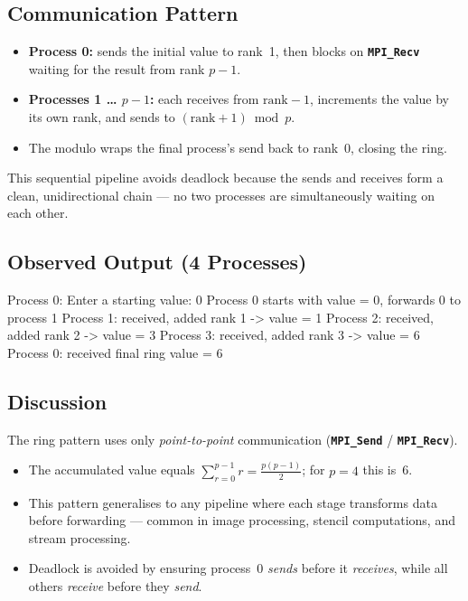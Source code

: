 \documentclass[12pt,a4paper]{article}
\newcommand{\mpiname}[1]{\texttt{\textbf{#1}}}
\begin{document}
\subsection{Communication Pattern}

\begin{itemize}[leftmargin=1.5em]
  \item \textbf{Process 0:} sends the initial value to rank~1, then blocks
        on \mpiname{MPI\_Recv} waiting for the result from rank $p-1$.
  \item \textbf{Processes 1 … $p-1$:} each receives from
        $\text{rank}-1$, increments the value by its own rank, and sends
        to $(\text{rank}+1) \bmod p$.
  \item The modulo wraps the final process's send back to rank~0, closing
        the ring.
\end{itemize}

This sequential pipeline avoids deadlock because the sends and receives
form a clean, unidirectional chain — no two processes are simultaneously
waiting on each other.

\subsection{Observed Output (4 Processes)}

\begin{outputbox}
Process 0: Enter a starting value: 0
Process 0 starts with value = 0, forwards 0 to process 1
Process 1: received, added rank 1  -> value = 1
Process 2: received, added rank 2  -> value = 3
Process 3: received, added rank 3  -> value = 6
Process 0: received final ring value = 6
\end{outputbox}

\subsection{Discussion}

\begin{answerbox}
The ring pattern uses only \emph{point-to-point} communication
(\mpiname{MPI\_Send} / \mpiname{MPI\_Recv}).

\begin{itemize}[nosep, leftmargin=1.2em]
  \item The accumulated value equals $\sum_{r=0}^{p-1} r =
        \frac{p(p-1)}{2}$; for $p=4$ this is~6.
  \item This pattern generalises to any pipeline where each stage
        transforms data before forwarding — common in image processing,
        stencil computations, and stream processing.
  \item Deadlock is avoided by ensuring process~0 \emph{sends} before it
        \emph{receives}, while all others \emph{receive} before they
        \emph{send}.
\end{itemize}
\end{answerbox}
\end{document}
